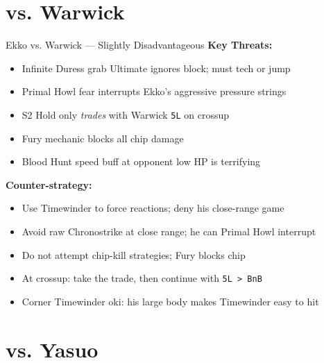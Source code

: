 \documentclass[12pt, a4paper]{report}
\newcommand{\notation}[1]{{\small\texttt{\textcolor{ekkoBlue}{#1}}}}
\newcommand{\champ}[1]{\textcolor{ekkoAccent}{\textbf{#1}}}
\begin{document}
\section{vs. \champ{Warwick}}

\begin{matchupbox}[]{Ekko vs. Warwick --- Slightly Disadvantageous}
\textbf{Key Threats:}
\begin{itemize}
  \item Infinite Duress grab Ultimate ignores block; must tech or jump
  \item Primal Howl fear interrupts Ekko's aggressive pressure strings
  \item S2 Hold only \textit{trades} with Warwick \notation{5L} on crossup
  \item Fury mechanic blocks all chip damage
  \item Blood Hunt speed buff at opponent low HP is terrifying
\end{itemize}
\textbf{Counter-strategy:}
\begin{itemize}
  \item Use Timewinder to force reactions; deny his close-range game
  \item Avoid raw Chronostrike at close range; he can Primal Howl interrupt
  \item Do not attempt chip-kill strategies; Fury blocks chip
  \item At crossup: take the trade, then continue with \notation{5L > BnB}
  \item Corner Timewinder oki: his large body makes Timewinder easy to hit
\end{itemize}
\end{matchupbox}

\section{vs. \champ{Yasuo}}
\end{document}
